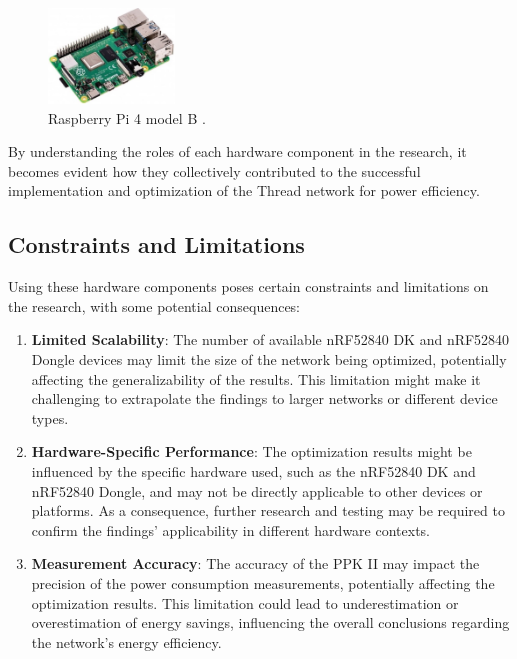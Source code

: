 \begin{figure}[H]
    \centering
    \includegraphics[width=0.3\textwidth]{images/situational_theoretical_analysis/Raspberry_Pi_4.jpg}
    \caption{Raspberry Pi 4 model B \cite{alm2019internet}.}
    \label{fig:Raspberry_Pi_4}
\end{figure}

By understanding the roles of each hardware component in the research, it becomes evident how they collectively contributed to the successful implementation and optimization of the Thread network for power efficiency.

\subsection{Constraints and Limitations}

Using these hardware components poses certain constraints and limitations on the research, with some potential consequences:

\begin{enumerate}
    \item \textbf{Limited Scalability}: The number of available \gls{nRF}52840 \gls{DK} and \gls{nRF}52840 Dongle devices may limit the size of the network being optimized, potentially affecting the generalizability of the results. This limitation might make it challenging to extrapolate the findings to larger networks or different device types.
    \item \textbf{Hardware-Specific Performance}: The optimization results might be influenced by the specific hardware used, such as the \gls{nRF}52840 \gls{DK} and \gls{nRF}52840 Dongle, and may not be directly applicable to other devices or platforms. As a consequence, further research and testing may be required to confirm the findings' applicability in different hardware contexts.
    \item \textbf{Measurement Accuracy}: The accuracy of the \gls{PPK} II may impact the precision of the power consumption measurements, potentially affecting the optimization results. This limitation could lead to underestimation or overestimation of energy savings, influencing the overall conclusions regarding the network's energy efficiency.
\end{enumerate}

